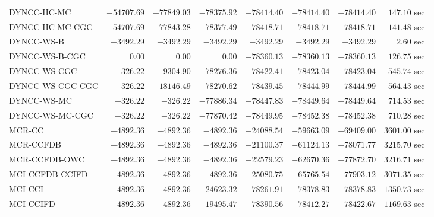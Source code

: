 \begin{table}[H]
\begin{tabular}{lrrrrrrr}
         DYNCC-HC-MC & $    -54707.69$ & $    -77849.03$ & $    -78375.92$ & $    -78414.40$ & $    -78414.40$ & $    -78414.40$ & $       147.10$ sec   \\ 
     DYNCC-HC-MC-CGC & $    -54707.69$ & $    -77843.28$ & $    -78377.49$ & $    -78418.71$ & $    -78418.71$ & $    -78418.71$ & $       141.48$ sec   \\ 
          DYNCC-WS-B & $     -3492.29$ & $     -3492.29$ & $     -3492.29$ & $     -3492.29$ & $     -3492.29$ & $     -3492.29$ & $         2.60$ sec   \\ 
      DYNCC-WS-B-CGC & $         0.00$ & $         0.00$ & $         0.00$ & $    -78360.13$ & $    -78360.13$ & $    -78360.13$ & $       126.75$ sec   \\ 
        DYNCC-WS-CGC & $      -326.22$ & $     -9304.90$ & $    -78276.36$ & $    -78422.41$ & $    -78423.04$ & $    -78423.04$ & $       545.74$ sec   \\ 
    DYNCC-WS-CGC-CGC & $      -326.22$ & $    -18146.49$ & $    -78270.62$ & $    -78439.45$ & $    -78444.99$ & $    -78444.99$ & $       564.43$ sec   \\ 
         DYNCC-WS-MC & $      -326.22$ & $      -326.22$ & $    -77886.34$ & $    -78447.83$ & $    -78449.64$ & $    -78449.64$ & $       714.53$ sec   \\ 
     DYNCC-WS-MC-CGC & $      -326.22$ & $      -326.22$ & $    -77870.42$ & $    -78449.95$ & $    -78452.38$ & $    -78452.38$ & $       710.28$ sec   \\ 
\cmidrule{1-1} 
              MCR-CC & $     -4892.36$ & $     -4892.36$ & $     -4892.36$ & $    -24088.54$ & $    -59663.09$ & $    -69409.00$ & $      3601.00$ sec   \\ 
           MCR-CCFDB & $     -4892.36$ & $     -4892.36$ & $     -4892.36$ & $    -21100.37$ & $    -61124.13$ & $    -78071.77$ & $      3215.70$ sec   \\ 
       MCR-CCFDB-OWC & $     -4892.36$ & $     -4892.36$ & $     -4892.36$ & $    -22579.23$ & $    -62670.36$ & $    -77872.70$ & $      3216.71$ sec   \\ 
\cmidrule{1-1} 
     MCI-CCFDB-CCIFD & $     -4892.36$ & $     -4892.36$ & $     -4892.36$ & $    -25080.75$ & $    -65765.54$ & $    -77903.12$ & $      3071.35$ sec   \\ 
             MCI-CCI & $     -4892.36$ & $     -4892.36$ & $    -24623.32$ & $    -78261.91$ & $    -78378.83$ & $    -78378.83$ & $      1350.73$ sec   \\ 
           MCI-CCIFD & $     -4892.36$ & $     -4892.36$ & $    -19495.47$ & $    -78390.56$ & $    -78412.27$ & $    -78422.67$ & $      1169.63$ sec   \\ 
\bottomrule
\end{tabular}
\end{table}
